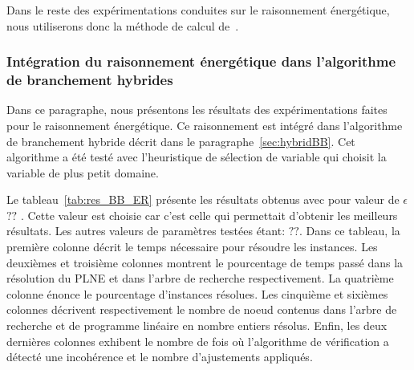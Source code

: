 Dans le reste des expérimentations conduites sur le raisonnement
énergétique, nous utiliserons donc la méthode de calcul de~\cite{DP}. 

\subsubsection{Intégration du raisonnement énergétique dans
  l'algorithme de branchement hybrides}

Dans ce paragraphe, nous présentons les résultats des expérimentations
faites pour le raisonnement énergétique. Ce raisonnement est intégré
dans l'algorithme de branchement hybride décrit dans le
paragraphe~\ref{sec:hybridBB}. Cet algorithme a été testé avec
l'heuristique de sélection de variable qui choisit la variable de plus
petit domaine.

Le tableau~\ref{tab:res_BB_ER} présente les résultats obtenus avec 
pour valeur de $\epsilon$ $??$ . Cette valeur est choisie car c'est celle
qui permettait d'obtenir les meilleurs résultats. Les autres valeurs
de paramètres testées étant: $??$. Dans ce tableau, la première
colonne décrit le temps nécessaire pour résoudre les instances. Les
deuxièmes et troisième colonnes montrent le pourcentage de temps passé
dans la résolution du PLNE et dans l'arbre de recherche
respectivement. La quatrième colonne énonce le pourcentage d'instances
résolues. Les cinquième et sixièmes colonnes décrivent respectivement
le nombre de noeud contenus dans l'arbre de recherche et de programme
linéaire en nombre entiers résolus. Enfin, les deux dernières colonnes
exhibent le nombre de fois où l'algorithme de vérification a détecté
une incohérence et le nombre d'ajustements appliqués. 

